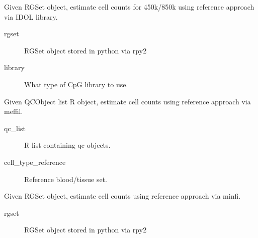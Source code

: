 \documentclass[letterpaper,10pt,english]{sphinxmanual}
\begin{document}
\begin{fulllineitems}
\label{\detokenize{index:pymethylprocess.meffil_functions.est_cell_counts_IDOL}}
Given RGSet object, estimate cell counts for 450k/850k using reference approach via IDOL library.
\begin{description}
\item[{rgset}] \leavevmode
RGSet object stored in python via rpy2

\item[{library}] \leavevmode
What type of CpG library to use.

\end{description}

\end{fulllineitems}


\begin{fulllineitems}
\label{\detokenize{index:pymethylprocess.meffil_functions.est_cell_counts_meffil}}
Given QCObject list R object, estimate cell counts using reference approach via meffil.
\begin{description}
\item[{qc\_list}] \leavevmode
R list containing qc objects.

\item[{cell\_type\_reference}] \leavevmode
Reference blood/tissue set.

\end{description}

\end{fulllineitems}


\begin{fulllineitems}
\label{\detokenize{index:pymethylprocess.meffil_functions.est_cell_counts_minfi}}
Given RGSet object, estimate cell counts using reference approach via minfi.
\begin{description}
\item[{rgset}] \leavevmode
RGSet object stored in python via rpy2

\end{description}

\end{fulllineitems}
\end{document}
